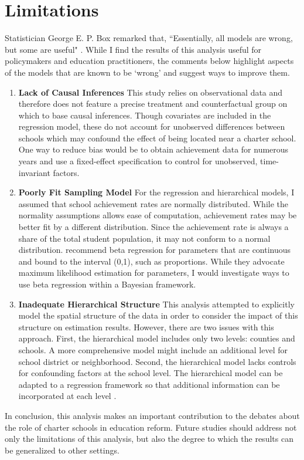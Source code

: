 \documentclass[11pt]{article}
\begin{document}
\section{Limitations}
Statistician George E. P. Box remarked that, ``Essentially, all models are wrong, but some are useful" \citep{box87}.  While I find the results of this analysis useful for policymakers and education practitioners, the comments below highlight aspects of the models that are known to be `wrong' and suggest ways to improve them.
\begin{enumerate}
\item \textbf{Lack of Causal Inferences} This study relies on observational data and therefore does not feature a precise treatment and counterfactual group on which to base causal inferences.  Though covariates are included in the regression model, these do not account for unobserved differences between schools which may confound the effect of being located near a charter school.  One way to reduce bias would be to obtain achievement data for numerous years and use a fixed-effect specification to control for unobserved, time-invariant factors.
\item \textbf{Poorly Fit Sampling Model} For the regression and hierarchical models, I assumed that school achievement rates are normally distributed.  While the normality assumptions allows ease of computation, achievement rates may be better fit by a different distribution.  Since the achievement rate is always a share of the total student population, it may not conform to a normal distribution.  \cite{ferrari04} recommend beta regression for parameters that are continuous and bound to the interval (0,1), such as proportions.  While they advocate maximum likelihood estimation for parameters, I would investigate ways to use beta regression within a Bayesian framework.
\item \textbf{Inadequate Hierarchical Structure}  This analysis attempted to explicitly model the spatial structure of the data in order to consider the impact of this structure on estimation results.  However, there are two issues with this approach.  First, the hierarchical model includes only two levels: counties and schools.  A more comprehensive model might include an additional level for school district or neighborhood.  Second, the hierarchical model lacks controls for confounding factors at the school level.  The hierarchical model can be adapted to a regression framework so that additional information can be incorporated at each level \citep{hoff09}.
\end{enumerate}
In conclusion, this analysis makes an important contribution to the debates about the role of charter schools in education reform.  Future studies should address not only the limitations of this analysis, but also the degree to which the results can be generalized to other settings. 

\newpage

{}
\end{document}
